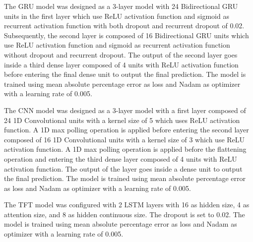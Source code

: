 The GRU model was designed as a 3-layer model with 24 Bidirectional GRU units in the first layer which use ReLU activation function and sigmoid as recurrent activation function with both dropout and recurrent dropout of 0.02.
Subsequently, the second layer is composed of 16 Bidirectional GRU units which use ReLU activation function and sigmoid as recurrent activation function without dropout and recurrent dropout.
The output of the second layer goes inside a third dense layer composed of 4 units with ReLU activation function before entering the final dense unit to output the final prediction.
The model is trained using mean absolute percentage error as loss and Nadam as optimizer with a learning rate of 0.005.

The CNN model was designed as a 3-layer model with a first layer composed of 24 1D Convolutional units with a kernel size of 5 which uses ReLU activation function.
A 1D max polling operation is applied before entering the second layer composed of 16 1D Convolutional units with a kernel size of 3 which use ReLU activation function.
A 1D max polling operation is applied before the flattening operation and entering the third dense layer composed of 4 units with ReLU activation function.
The output of the layer goes inside a dense unit to output the final prediction.
The model is trained using mean absolute percentage error as loss and Nadam as optimizer with a learning rate of 0.005.

The TFT model was configured with 2 LSTM layers with 16 as hidden size, 4 as attention size, and 8 as hidden continuous size.
The dropout is set to 0.02.
The model is trained using mean absolute percentage error as loss and Nadam as optimizer with a learning rate of 0.005.

